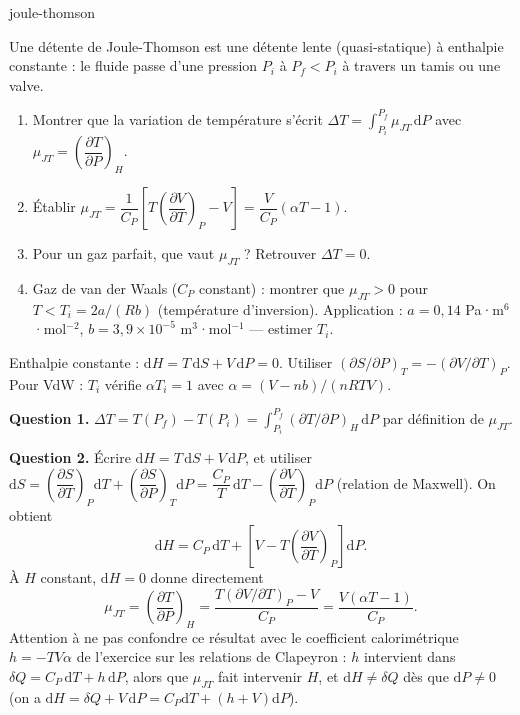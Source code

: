 \begin{exo}{joule-thomson}

Une détente de Joule-Thomson est une détente lente (quasi-statique) à enthalpie constante : le fluide passe d'une pression $P_i$ à $P_f < P_i$ à travers un tamis ou une valve.

\begin{enumerate}
\item Montrer que la variation de température s'écrit $\Delta T = \displaystyle\int_{P_i}^{P_f} \mu_{JT}\,\mathrm{d}P$ avec $\mu_{JT} = \left(\dfrac{\partial T}{\partial P}\right)_H$.
\item Établir $\mu_{JT} = \dfrac{1}{C_P}\left[T\left(\dfrac{\partial V}{\partial T}\right)_P - V\right] = \dfrac{V}{C_P}(\alpha T - 1)$.
\item Pour un gaz parfait, que vaut $\mu_{JT}$ ? Retrouver $\Delta T = 0$.
\item Gaz de van der Waals ($C_P$ constant) : montrer que $\mu_{JT} > 0$ pour $T < T_i = 2a/(Rb)$ (température d'inversion). Application : $a = 0{,}14$ Pa·m$^6$·mol$^{-2}$, $b = 3{,}9\times10^{-5}$ m$^3$·mol$^{-1}$ — estimer $T_i$.
\end{enumerate}

\begin{indication}
Enthalpie constante : $\mathrm{d}H = T\,\mathrm{d}S + V\,\mathrm{d}P = 0$. Utiliser $\left(\partial S/\partial P\right)_T = -\left(\partial V/\partial T\right)_P$. Pour VdW : $T_i$ vérifie $\alpha T_i = 1$ avec $\alpha = (V-nb)/(nRTV)$.
\end{indication}

\begin{solution}
\textbf{Question 1.} $\Delta T = T(P_f) - T(P_i) = \int_{P_i}^{P_f} (\partial T/\partial P)_H\,\mathrm{d}P$ par définition de $\mu_{JT}$.

\textbf{Question 2.} Écrire $\mathrm{d}H = T\,\mathrm{d}S + V\,\mathrm{d}P$, et utiliser $\mathrm{d}S = \left(\dfrac{\partial S}{\partial T}\right)_P\mathrm{d}T + \left(\dfrac{\partial S}{\partial P}\right)_T\mathrm{d}P = \dfrac{C_P}{T}\,\mathrm{d}T - \left(\dfrac{\partial V}{\partial T}\right)_P\mathrm{d}P$ (relation de Maxwell). On obtient
\[
\mathrm{d}H = C_P\,\mathrm{d}T + \left[V - T\left(\frac{\partial V}{\partial T}\right)_P\right]\mathrm{d}P.
\]
À $H$ constant, $\mathrm{d}H = 0$ donne directement
\[
\mu_{JT} = \left(\frac{\partial T}{\partial P}\right)_H = \frac{T\left(\partial V/\partial T\right)_P - V}{C_P} = \frac{V(\alpha T - 1)}{C_P}.
\]
Attention à ne pas confondre ce résultat avec le coefficient calorimétrique $h = -TV\alpha$ de l'exercice sur les relations de Clapeyron : $h$ intervient dans $\delta Q = C_P\,\mathrm{d}T + h\,\mathrm{d}P$, alors que $\mu_{JT}$ fait intervenir $H$, et $\mathrm{d}H \neq \delta Q$ dès que $\mathrm{d}P \neq 0$ (on a $\mathrm{d}H = \delta Q + V\,\mathrm{d}P = C_P\mathrm{d}T + (h+V)\mathrm{d}P$).


\end{solution}
\end{exo}
